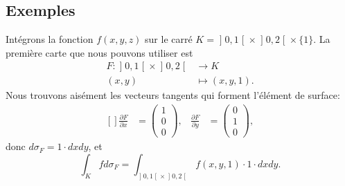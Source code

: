 \subsection{Exemples}

Intégrons la fonction $f(x,y,z)$ sur le carré $K=\mathopen] 0 , 1 \mathclose[\times \mathopen] 0 , 2 \mathclose[\times\{ 1 \}$. La première carte que nous pouvons utiliser est
\begin{equation}
	\begin{aligned}
		F\colon \mathopen] 0 , 1 \mathclose[\times\mathopen] 0 , 2 \mathclose[&\to K \\
		(x,y)&\mapsto (x,y,1).
	\end{aligned}
\end{equation}
Nous trouvons aisément les vecteurs tangents qui forment l'élément de surface:
\begin{equation}
	\begin{aligned}[]
		\frac{ \partial F }{ \partial x }&=\begin{pmatrix}
			1	\\
			0	\\
			0
		\end{pmatrix},
		&\frac{ \partial F }{ \partial y }&=\begin{pmatrix}
			0	\\
			1	\\
			0
		\end{pmatrix},
	\end{aligned}
\end{equation}
donc $d\sigma_F=1\cdot dxdy$, et
\begin{equation}		\label{IntKSurcarrUn}
	\int_Kfd\sigma_F=\int_{\mathopen] 0 , 1 \mathclose[\times\mathopen] 0 , 2 \mathclose[}f(x,y,1)\cdot 1\cdot dxdy.
\end{equation}

